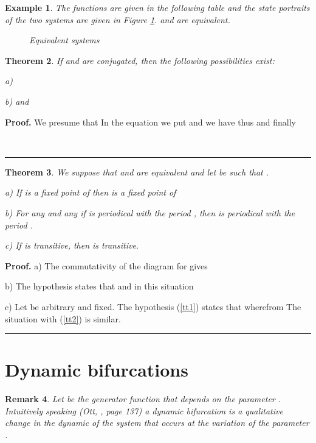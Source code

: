 \documentclass[12pt]{article}\usepackage{amsmath}
\newtheorem{theorem}{Theorem}
\newtheorem{example}[theorem]{Example}
\newtheorem{remark}[theorem]{Remark}
\newenvironment{proof}[1][Proof]{\textbf{#1.} }{\ \rule{0.5em}{0.5em}}
\begin{document}
\begin{example}
The functions  are given
in the following table
and the state portraits of the two systems are given in Figure \ref{echiv2}.
 and  are equivalent.\begin{figure}
[ptb]
\begin{center}
\caption{Equivalent systems}\label{echiv2}\end{center}
\end{figure}

\end{example}

\begin{theorem}
If  and  are conjugated, then the following possibilities exist:

a) 

b)  and 
\end{theorem}

\begin{proof}
We presume that  In the
equation
we put  and we have
thus  and finally

\end{proof}

\begin{theorem}
We suppose that  and  are equivalent and let be
 such that .

a) If  is a fixed point of  then  is a fixed point of


b) For any  and any  if  is periodical with the period , then  is periodical with the period .

c) If  is transitive, then  is transitive.
\end{theorem}

\begin{proof}
a) The commutativity of the diagram
for  gives


b) The hypothesis states that 
and in this situation


c) Let  be arbitrary and fixed. The
hypothesis (\ref{tt1}) states that
wherefrom
The situation with (\ref{tt2}) is similar.
\end{proof}

\section{Dynamic bifurcations}

\begin{remark}
Let be the generator function   that depends on
the parameter . Intuitively speaking (Ott,
\cite{bib3}, page 137) a dynamic bifurcation is a qualitative change in the
dynamic of the system  that occurs at the variation
of the parameter .
\end{remark}
\end{document}

